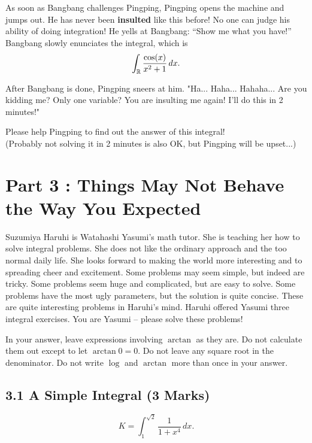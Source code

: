 \documentclass[12pt]{article}
\begin{document}
\par As soon as Bangbang challenges Pingping, Pingping opens the machine and jumps out. He has never been \textbf{insulted} like 
this before! No one can judge his ability of doing integration! He yells at Bangbang: ``Show me what you have!''
Bangbang slowly enunciates the integral, which is
\begin{equation*}
    \int_{\mathbb{R}} \frac{\cos (x)}{x^2+1}\,dx. 
\end{equation*}

\par After Bangbang is done, Pingping sneers at him. "Ha... Haha... Hahaha... Are you kidding me? Only one variable? 
You are insulting me again! I'll do this in 2 minutes!"

\par Please help Pingping to find out the answer of this integral!\\

\hfill (Probably not solving it in 2 minutes is also OK, but Pingping will be upset...)
\newpage
\section*{Part 3 : Things May Not Behave the Way You Expected}

Suzumiya Haruhi is Watahashi Yasumi's math tutor. She is teaching her how to solve integral problems. She does not like the ordinary approach and the too normal daily life. She looks forward to making the world more interesting and to spreading cheer and excitement. Some problems may seem simple, but indeed  are tricky. Some problems seem huge and complicated, but are easy to solve. Some problems have the most ugly parameters, but the solution is quite concise. These are quite interesting problems in Haruhi's mind. Haruhi offered Yasumi three integral exercises. You are Yasumi -- please solve these problems!

\par In your answer, leave expressions involving $\arctan$ as  they are. Do not calculate them out except to let $\arctan 0 = 0$. Do not leave any square root in the denominator. Do not write $\log$ and $\arctan$ more than once in your answer.

\subsection*{3.1 A Simple Integral (3 Marks)}
\begin{equation*}
    K = \int^{\sqrt{2}}_{1} \frac{1}{1 + x^4}\,dx. 
\end{equation*}
\end{document}
